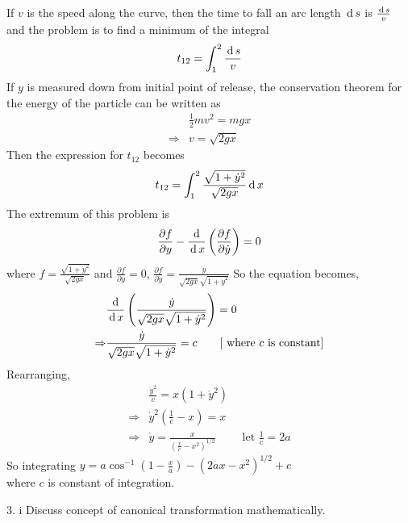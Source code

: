 \documentclass[12pt]{article}
\begin{document}
\begin{soln}
     If \(v\) is the speed along the curve, then the time to fall an arc length \(\,\mathrm{d}\, s\) is \(\frac{\,\mathrm{d}\, s}{v}\) and the problem is to find a minimum of the integral \[t_{12}=\int_1^2 \frac{\,\mathrm{d}\, s}{v}\]
     If \(y\) is measured down from initial point of release, the conservation theorem for the energy of the particle can be written as 
     \begin{align*}
        &\frac{1}{2}mv^2=mgx\\
        \Rightarrow & v=\sqrt{2gx}
     \end{align*}
     Then the expression for \(t_{12}\) becomes
     \[t_{12}=\int_1^2 \frac{\sqrt{1+\dot{y}^2}}{\sqrt{2gx}}\,\mathrm{d}\, x \]
     The extremum of this problem is 
     \[\frac{\partial f}{\partial y}-\frac{\,\mathrm{d}\,}{\,\mathrm{d}\, x}\left( \frac{\partial f}{\partial \dot{y}} \right)=0\]
     where \(f=\frac{\sqrt{1+\dot{y}^2}}{\sqrt{2gx}}\) and \(\frac{\partial f}{\partial y}=0\), \(\frac{\partial f}{\partial \dot{y}}=\frac{\dot{y}}{\sqrt{2gx}\sqrt{1+\dot{y}^2}}\)
     So the equation becomes,
     \begin{align*}
        &\frac{\,\mathrm{d}\,}{\,\mathrm{d}\, x}\left( \frac{\dot{y}}{\sqrt{2gx}\sqrt{1+\dot{y}^2}} \right)=0\\
        \Rightarrow & \frac{\dot{y}}{\sqrt{2gx}\sqrt{1+\dot{y}^2}}=c \qquad [\text{ where \(c\) is constant}]
     \end{align*}
     Rearranging,
     \begin{align*}
        & \frac{\dot{y}^2}{c}=x(1+\dot{y}^2)\\
        \Rightarrow & \dot{y}^2 \left( \frac{1}{c}-x \right)=x\\
        \Rightarrow & \dot{y}=\frac{x}{(\frac{x}{c}-x^2)^{1/2}} \qquad \text{ let } \frac{1}{c}=2a
     \end{align*}
    So integrating \(y=a \cos^{-1}(1-\frac{x}{a})-(2ax-x^2)^{1/2}+c\)\\
    where \(c\) is constant of integration.
\end{soln}
\begin{prob}{3. i}
    Discuss concept of canonical transformation mathematically.
\end{prob}
\end{document}
